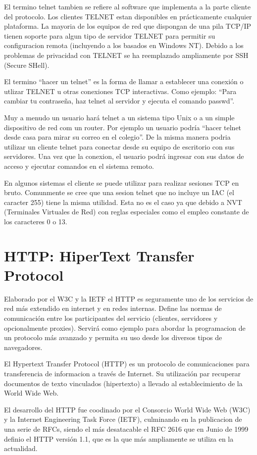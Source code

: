 \documentclass[a4paper,spanish,12pt]{book}
\begin{document}
El termino telnet tambien se refiere al software que implementa a la parte cliente del protocolo. Los clientes TELNET estan disponibles en prácticamente cualquier plataforma. La mayoria de los equipos de red que dispongan de una pila TCP/IP tienen soporte  para algun tipo de servidor TELNET para permitir su configuracion remota (incluyendo a los basados en Windows NT). Debido a los problemas de privacidad con TELNET se ha reemplazado ampliamente por SSH (Secure SHell).

El termino ``hacer un telnet'' es la forma de llamar a establecer una conexión o utlizar TELNET u otras conexiones TCP interactivas. Como ejemplo: ``Para cambiar tu contraseña, haz telnet al servidor y ejecuta el comando passwd''.

Muy a menudo un usuario hará telnet a un sistema tipo Unix o a un simple dispositivo de red com un router. Por ejemplo un usuario podría ``hacer telnet desde casa para mirar su correo en el colegio''. De la misma manera podria utilizar un cliente telnet para conectar desde su equipo de escritorio con sus servidores. Una vez que la conexion, el usuario podrá ingresar con sus datos de acceso y ejecutar comandos en el sistema remoto.

En algunos sistemas el cliente se puede utilizar para realizar sesiones TCP en bruto. Comunmente se cree que una sesion telnet que no incluye un IAC (el caracter 255) tiene la misma utilidad. Esta no es el caso ya que debido a NVT (Terminales Virtuales de Red) con reglas especiales como el empleo constante de los caracteres 0 o 13.

\section{HTTP: HiperText Transfer Protocol}
Elaborado por el W3C y la IETF el HTTP es seguramente uno de los servicios de red más extendido en internet y en redes internas. Define las normas de comunicación entre los participantes del servicio (clientes, servidores y opcionalmente proxies). Servirá como ejemplo para abordar la programacion de un protocolo m\'as avanzado y permita su uso desde los diversos tipos de navegadores.

El Hypertext Transfer Protocol (HTTP) es un protocolo de comunicaciones para transferencia de informacion a trav\'es de Internet. Su utilización par recuperar documentos de texto vinculados (hipertexto) a llevado al establecimiento de la World Wide Web.

El desarrollo del HTTP fue coodinado por el Consorcio World Wide Web (W3C) y la Internet Engineering Task Force (IETF), culminando en la publicacion de una serie de RFCs, siendo el más desatacable el RFC 2616 que en Junio de 1999 definio el HTTP versión 1.1, que es la que más ampliamente se utiliza en la actualidad.
\end{document}
